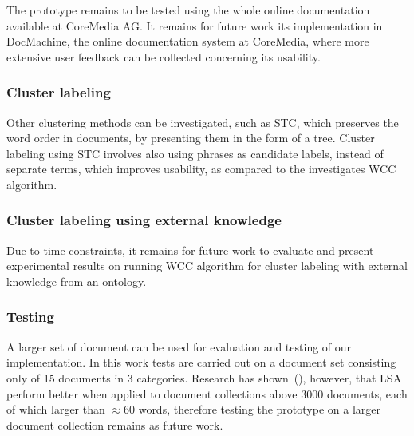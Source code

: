The prototype remains to be tested using the whole online documentation available at CoreMedia AG. It remains for future work its implementation in DocMachine, the online documentation system at CoreMedia, where more extensive user feedback can be collected concerning its usability.

\subsubsection{Cluster labeling}
Other clustering methods can be investigated, such as \gls{STC}, which preserves the word order in documents, by presenting them in the form of a tree. Cluster labeling using \gls{STC} involves also using phrases as candidate labels, instead of separate terms, which improves usability, as compared 
to the investigates \gls{WCC} algorithm. \\

\subsubsection{Cluster labeling using external knowledge}
Due to time constraints, it remains for future work to evaluate and present experimental results on running \gls{WCC} algorithm for cluster labeling with external knowledge from an ontology. \\

\pagebreak
\subsubsection{Testing}
A larger set of document can be used for evaluation and testing of our implementation. In this work tests are carried out on a document set consisting only of 15 documents in 3 categories. Research has shown~(\cite{dumais91improving}), however, that \gls{LSA} perform better when applied to document collections above 3000 documents, each of which larger than $\approx 60$ words, therefore testing the prototype on a larger document collection remains as future work. \\

